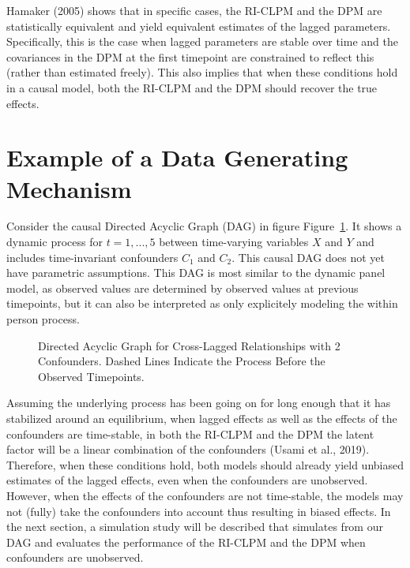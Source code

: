 \documentclass[
]{interact}
\begin{document}
Hamaker (2005) shows that in specific cases, the RI-CLPM and the DPM are
statistically equivalent and yield equivalent estimates of the lagged
parameters. Specifically, this is the case when lagged parameters are
stable over time and the covariances in the DPM at the first timepoint
are constrained to reflect this (rather than estimated freely). This
also implies that when these conditions hold in a causal model, both the
RI-CLPM and the DPM should recover the true effects.

\hypertarget{example-of-a-data-generating-mechanism}{%
\section{Example of a Data Generating
Mechanism}\label{example-of-a-data-generating-mechanism}}

Consider the causal Directed Acyclic Graph (DAG) in figure
Figure~\ref{fig-scm}. It shows a dynamic process for \(t=1,...,5\)
between time-varying variables \(X\) and \(Y\) and includes
time-invariant confounders \(C_1\) and \(C_2\). This causal DAG does not
yet have parametric assumptions. This DAG is most similar to the dynamic
panel model, as observed values are determined by observed values at
previous timepoints, but it can also be interpreted as only explicitely
modeling the within person process.

\begin{figure}

{\centering 



}

\caption{\label{fig-scm}Directed Acyclic Graph for Cross-Lagged
Relationships with 2 Confounders. Dashed Lines Indicate the Process
Before the Observed Timepoints.}

\end{figure}

Assuming the underlying process has been going on for long enough that
it has stabilized around an equilibrium, when lagged effects as well as
the effects of the confounders are time-stable, in both the RI-CLPM and
the DPM the latent factor will be a linear combination of the
confounders (Usami et al., 2019). Therefore, when these conditions hold,
both models should already yield unbiased estimates of the lagged
effects, even when the confounders are unobserved. However, when the
effects of the confounders are not time-stable, the models may not
(fully) take the confounders into account thus resulting in biased
effects. In the next section, a simulation study will be described that
simulates from our DAG and evaluates the performance of the RI-CLPM and
the DPM when confounders are unobserved.
\end{document}
